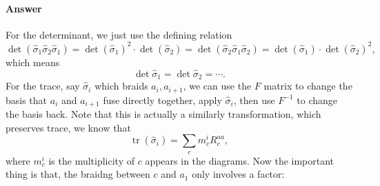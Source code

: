 \paragraph{Answer}
For the determinant, we just use the defining relation
\begin{equation*}
\det(\hat{\sigma }_{1}\hat{\sigma }_{2}\hat{\sigma }_{1}) =\det (\hat{\sigma }_{1} )^{2} \cdot \det(\hat{\sigma }_{2}) =\det (\hat{\sigma }_{2}\hat{\sigma }_{1}\hat{\sigma }_{2} )=\det (\hat{\sigma }_{1} )\cdot \det(\hat{\sigma }_{2})^{2} ,
\end{equation*}
which means 
\begin{equation*}
\det\hat{\sigma }_{1} =\det\hat{\sigma }_{2} =\cdots .
\end{equation*}
For the trace, say $\hat{\sigma }_{i}$ which braids $a_{i} ,a_{i+1}$, we can use the $F$ matrix to change the basis that $a_{i}$ and $a_{i+1}$ fuse directly together, apply $\hat{\sigma }_{i}$, then use $F^{-1}$ to change the basis back. Note that this is actually a similarly transformation, which preserves trace, we know that
\begin{equation*}
\operatorname{tr}(\hat{\sigma }_{i}) =\sum _{c} m_{c}^{i} R_{c}^{aa} ,
\end{equation*}
where $m_{c}^{i}$ is the multiplicity of $c$ appears in the diagrams. Now the important thing is that, the braidng between $c$ and $a_{1}$ only involves a factor:
